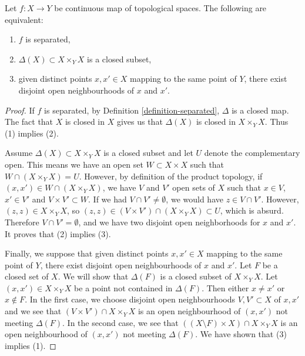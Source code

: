 \begin{lemma}
\label{lemma-separated}
Let $f : X \to Y$ be continuous map of topological spaces.
The following are equivalent:
\begin{enumerate}
\item $f$ is separated,
\item $\Delta(X) \subset X \times_Y X$ is a closed subset,
\item given distinct points $x, x' \in X$ mapping to the same point of
$Y$, there exist disjoint open neighbourhoods of $x$ and $x'$.
\end{enumerate}
\end{lemma}

\begin{proof}
If $f$ is separated, by Definition \ref{definition-separated}, $\Delta$ is a
closed map. The fact that $X$ is closed in $X$ gives us that $\Delta(X)$ is
closed in $ X\times_Y X $. Thus (1) implies (2).

\medskip\noindent
Assume $\Delta(X) \subset X \times_Y X$ is a closed subset and let $U$
denote the complementary open. This means we have an open set
$W \subset X \times X$ such that $W \cap (X \times_Y X) = U$. However,
by definition of the product topology, if
$(x, x') \in W \cap (X \times_Y X)$,
we have $V$ and $V'$ open sets of $X$ such that $x \in V$, $x' \in V'$ and
$V \times V' \subset W$. If we had $V \cap V' \neq \emptyset$, we would have
$z \in V \cap V'$. However, $(z, z) \in X \times_Y X$, so
$(z,z) \in (V \times V') \cap (X\times_Y X) \subset U$, which is absurd.
Therefore $V \cap V' = \emptyset $, and we have two disjoint open
neighborhoods for $x$ and $x'$. It proves that (2) implies (3).

\medskip\noindent
Finally, we suppose that given distinct points $x, x' \in X$ mapping to
the same point of $Y$, there exist disjoint open neighbourhoods
of $x$ and $x'$. Let $F$ be a closed set of $X$. We will show that
$\Delta(F)$ is a closed subset of $X \times_Y X$. Let
$(x, x') \in X \times_Y X$ be a point not contained in $\Delta(F)$.
Then either $x \not = x'$ or $x \not \in F$.
In the first case, we choose disjoint open neighbourhoods
$V, V' \subset X$ of $x, x'$ and we see that $(V \times V') \cap X \times_Y X$
is an open neighbourhood of $(x, x')$ not meeting $\Delta(F)$.
In the second case, we see that $((X \setminus F) \times X) \cap X \times_Y X$
is an open neighbourhood of $(x, x')$ not meeting $\Delta(F)$.
We have shown that (3) implies (1).
\end{proof}

